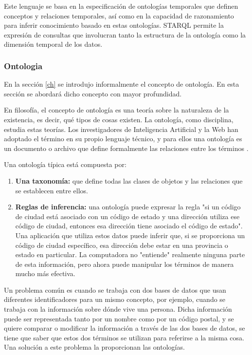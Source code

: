 \documentclass[12pt]{article}
\begin{document}
Este lenguaje se basa en la especificación de ontologías temporales que definen conceptos y relaciones temporales, así como en la capacidad de razonamiento para inferir conocimiento basado en estas ontologías. STARQL permite la expresión de consultas que involucran tanto la estructura de la ontología como la dimensión temporal de los datos.

\subsubsection{Ontologia}

En la sección \ref{ch} se introdujo informalmente el concepto de ontología. En esta sección se abordará dicho concepto con mayor profundidad.

En filosofía, el concepto de ontología es una teoría sobre la naturaleza de la existencia, es decir, qué tipos de cosas existen. La ontología, como disciplina, estudia estas teorías. Los investigadores de Inteligencia Artificial y la Web han adoptado el término en su propio lenguaje técnico, y para ellos una ontología es un documento o archivo que define formalmente las relaciones entre los términos \citep{ref10}. 

Una ontología típica está compuesta por: \citep{ref10}
\begin{enumerate}
    \item {
    
        \textbf{Una taxonomía:} que define todas las clases de objetos y las relaciones que se establecen entre ellos.
    }
    \item {
       
        \textbf{Reglas de inferencia:} una ontología puede expresar la regla "si un código de ciudad está asociado con un código de estado y una dirección utiliza ese código de ciudad, entonces esa dirección tiene asociado el código de estado". Una aplicación que utiliza estos datos puede inferir que, si se proporciona un código de ciudad específico, esa dirección debe estar en una provincia o estado en particular. La computadora no "entiende" realmente ninguna parte de esta información, pero ahora puede manipular los términos de manera mucho más efectiva.
        }
        
\end{enumerate}

Un problema común es cuando se trabaja con dos bases de datos que usan diferentes identificadores para un mismo concepto, por ejemplo, cuando se trabaja con la información sobre dónde vive una persona. Dicha información puede ser representada tanto por un nombre como por un código postal, y se quiere comparar o modificar la información a través de las dos bases de datos, se tiene que saber que estos dos términos se utilizan para referirse a la misma cosa. Una solución a este problema la proporcionan las ontologías.
\end{document}
